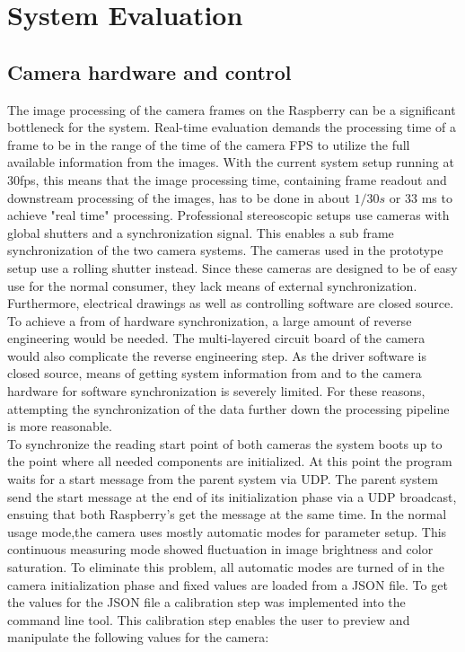 \chapter{System Evaluation}
\section{Camera hardware and control}
The image processing of the camera frames on the Raspberry can be a significant bottleneck for the system. Real-time evaluation demands the processing time of a frame to be in the range of the time of the camera FPS to utilize the full available information from the images. With the current system setup running at 30fps, this means that the image processing time, containing frame readout and downstream processing of the images, has to be done in about $1/30s$ or 33 ms to achieve "real time" processing. Professional stereoscopic setups use cameras with global shutters and a synchronization signal. This enables a sub frame synchronization of the two camera systems. The cameras used in the prototype setup use a rolling shutter instead. Since these cameras are designed to be of easy use for the normal consumer, they lack means of external synchronization. Furthermore, electrical drawings as well as controlling software are closed source. To achieve a from of hardware synchronization, a large amount of reverse engineering would be needed. The multi-layered circuit board of the camera would also complicate the reverse engineering step. As the driver software is closed source, means of getting system information from and to the camera hardware for software synchronization is severely limited. For these reasons, attempting the synchronization of the data further down the processing pipeline is more reasonable.
\\To synchronize the reading start point of both cameras the system boots up to the point where all needed components are initialized. At this point the program waits for a start message from the parent system via UDP. The parent system send the start message at the end of its initialization phase via a UDP broadcast, ensuing that both Raspberry's get the message at the same time.
\newpage
In the normal usage mode,the camera uses mostly automatic modes for parameter setup. This continuous measuring mode showed fluctuation in image brightness and color saturation. To eliminate this problem, all automatic modes are turned of in the camera initialization phase and fixed values are loaded from a JSON file. To get the values for the JSON file a calibration step was implemented into the command line tool. This calibration step enables the user to preview and manipulate the  following values for the camera:
